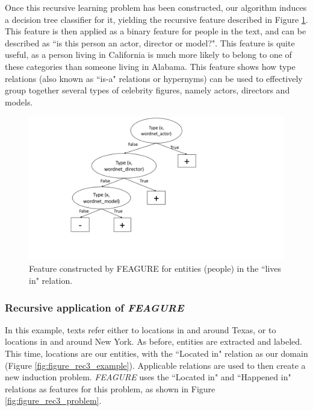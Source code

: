 \documentclass[twoside,11pt]{article}
\theoremstyle{definition}
\begin{document}
Once this recursive learning problem has been constructed, our algorithm induces a decision tree classifier for it, yielding the recursive feature described in Figure \ref{fig:figure_rec2_feature}. This feature is then applied as a binary feature for people in the text, and can be described as ``is this person an actor, director or model?".
This feature is quite useful, as a person living in California is much more likely to belong to one of these categories than someone living in Alabama. This feature shows how type relations (also known as ``is-a" relations or hypernyms) can be used to effectively group together several types of celebrity figures, namely actors, directors and models.

\begin{figure}[h!]
	\centering
	\includegraphics[width=0.7\linewidth]{figure_rec2_feature_new}
	\caption{Feature constructed by FEAGURE for entities (people) in the ``lives in" relation.}
	\label{fig:figure_rec2_feature}
\end{figure}

\subsubsection{Recursive application of \emph{FEAGURE}}

In this example, texts refer either to locations in and around Texas, or to locations in and around New York. As before, entities are extracted and labeled. This time, locations are our entities, with the ``Located in" relation as our domain (Figure \ref{fig:figure_rec3_example}). Applicable relations are used to then create a new induction problem. \emph{FEAGURE} uses the ``Located in" and ``Happened in" relations as features for this problem, as shown in Figure \ref{fig:figure_rec3_problem}. 
\end{document}
